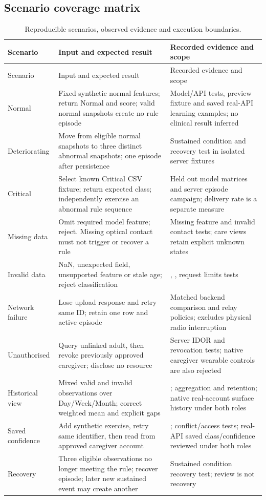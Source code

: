 \subsection{Scenario coverage matrix}
\small
\begin{longtable}{@{}P{24mm}P{62mm}P{67mm}@{}}
\caption{Reproducible scenarios, observed evidence and execution boundaries.}\\
\toprule Scenario & Input and expected result & Recorded evidence and scope\\\midrule\endfirsthead
\toprule Scenario & Input and expected result & Recorded evidence and scope\\\midrule\endhead
Normal & Fixed synthetic normal features; return Normal and score; valid normal snapshots create no rule episode & Model/API tests, preview fixture and saved real-API learning examples; no clinical result inferred\\
Deteriorating & Move from eligible normal snapshots to three distinct abnormal snapshots; one episode after persistence & Sustained condition and recovery test in isolated server fixtures\\
Critical & Select known Critical CSV fixture; return expected class; independently exercise an abnormal rule sequence & Held out model matrices and server episode campaign; delivery rate is a separate measure\\
Missing data & Omit required model feature; reject. Missing optical contact must not trigger or recover a rule & Missing feature and invalid contact tests; care views retain explicit unknown states\\
Invalid data & NaN, unexpected field, unsupported feature or stale age; reject classification & , , request limits tests\\
Network failure & Lose upload response and retry same ID; retain one row and active episode & Matched backend comparison and relay policies; excludes physical radio interruption\\
Unauthorised & Query unlinked adult, then revoke previously approved caregiver; disclose no resource & Server IDOR and revocation tests; native caregiver wearable controls are also rejected\\
Historical view & Mixed valid and invalid observations over Day/Week/Month; correct weighted mean and explicit gaps & ; aggregation and retention; native real-account surface history under both roles\\
Saved confidence & Add synthetic exercise, retry same identifier, then read from approved caregiver account & ; conflict/access tests; real-API saved class/confidence reviewed under both roles\\
Recovery & Three eligible observations no longer meeting the rule; recover episode; later new sustained event may create another & Sustained condition recovery test; review is not recovery\\\bottomrule
\end{longtable}
\normalsize

